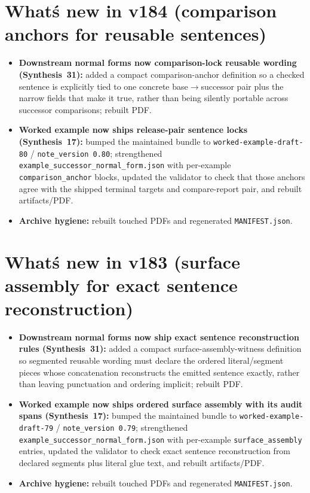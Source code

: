 \documentclass[11pt]{article}
\begin{document}
\section{What\'s new in v184 (comparison anchors for reusable sentences)}
\begin{itemize}[leftmargin=*]
\item \textbf{Downstream normal forms now comparison-lock reusable wording (Synthesis~31):} added a compact comparison-anchor definition so a checked sentence is explicitly tied to one concrete base$\to$successor pair plus the narrow fields that make it true, rather than being silently portable across successor comparisons; rebuilt PDF.
\item \textbf{Worked example now ships release-pair sentence locks (Synthesis~17):} bumped the maintained bundle to \texttt{worked-example-draft-80} / \texttt{note\_version 0.80}; strengthened \texttt{example\_successor\_normal\_form.json} with per-example \texttt{comparison\_anchor} blocks, updated the validator to check that those anchors agree with the shipped terminal targets and compare-report pair, and rebuilt artifacts/PDF.
\item \textbf{Archive hygiene:} rebuilt touched PDFs and regenerated \texttt{MANIFEST.json}.
\end{itemize}

\section{What\'s new in v183 (surface assembly for exact sentence reconstruction)}
\begin{itemize}[leftmargin=*]
\item \textbf{Downstream normal forms now ship exact sentence reconstruction rules (Synthesis~31):} added a compact surface-assembly-witness definition so segmented reusable wording must declare the ordered literal/segment pieces whose concatenation reconstructs the emitted sentence exactly, rather than leaving punctuation and ordering implicit; rebuilt PDF.
\item \textbf{Worked example now ships ordered surface assembly with its audit spans (Synthesis~17):} bumped the maintained bundle to \texttt{worked-example-draft-79} / \texttt{note\_version 0.79}; strengthened \texttt{example\_successor\_normal\_form.json} with per-example \texttt{surface\_assembly} entries, updated the validator to check exact sentence reconstruction from declared segments plus literal glue text, and rebuilt artifacts/PDF.
\item \textbf{Archive hygiene:} rebuilt touched PDFs and regenerated \texttt{MANIFEST.json}.
\end{itemize}
\end{document}
